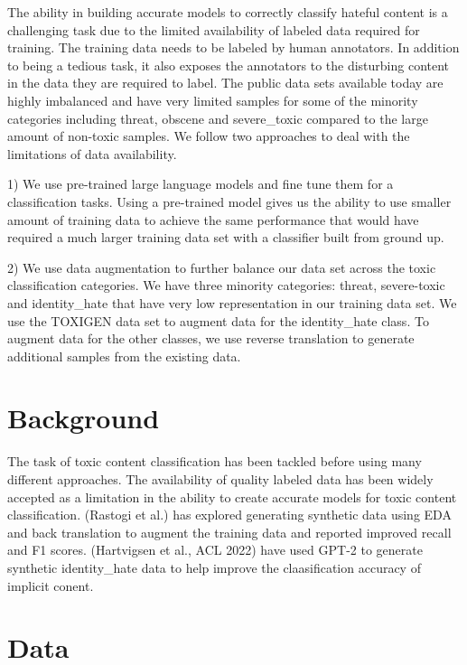 \documentclass[11pt,a4paper]{article}
\begin{document}
The ability in building accurate models to correctly classify hateful content is a challenging task due to the limited availability of labeled data required for training. The training data needs to be labeled by human annotators. In addition to being a tedious task, it also exposes the annotators to the disturbing content in the data they are required to label. The public data sets available today are highly imbalanced and have very limited samples for some of the minority categories including threat, obscene and severe\_toxic compared to the large amount of non-toxic samples. We follow two approaches to deal with the limitations of data availability.

1) We use pre-trained large language models and fine tune them for a classification tasks. Using a pre-trained model gives us the ability to use smaller amount of training data to achieve the same performance that would have required a much larger training data set with a classifier built from ground up.

2) We use data augmentation to further balance our data set across the toxic classification categories. We have three minority categories: threat, severe-toxic and identity\_hate that have very low representation in our training data set. We use the TOXIGEN data set to augment data for the identity\_hate class. To augment data for the other classes, we use reverse translation to generate additional samples from the existing data. 



\section{Background}
The task of toxic content classification has been tackled before using many different approaches. The availability of quality labeled data has been widely accepted as a limitation in the ability to create accurate models for toxic content classification.
(Rastogi et al.) has explored generating synthetic data using EDA and back translation to augment the training data and reported improved recall and F1 scores. (Hartvigsen et al., ACL 2022) have used GPT-2 to generate synthetic identity_hate data to help improve the claasification accuracy of implicit conent. 


\section{Data}
\end{document}
